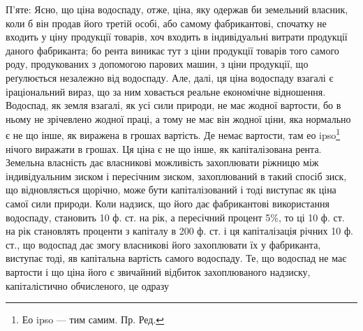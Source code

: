 П’яте: Ясно, що ціна водоспаду, отже, ціна, яку одержав би земельний
власник, коли б він продав його третій особі, або самому фабрикантові,
спочатку не входить у ціну продукції товарів, хоч входить в індивідуальні
витрати продукції даного фабриканта; бо рента виникає тут з ціни продукції
товарів того самого роду, продукованих з допомогою парових машин,
з ціни продукції, що реґулюється незалежно від водоспаду. Але, далі, ця ціна
водоспаду взагалі є іраціональний вираз, що за ним ховається реальне економічне
відношення. Водоспад, як земля взагалі, як усі сили природи, не має
жодної вартости, бо в ньому не зрічевлено жодної праці, а тому не має він
жодної ціни, яка нормально є не що інше, як виражена в грошах вартість.
Де немає вартости, там ео ipso\footnote*{
Ео ipso — тим самим. Пр. Ред.
} нічого виражати в грошах. Ця ціна є не
що інше, як капіталізована рента. Земельна власність дає власникові можливість
захоплювати ріжницю між індивідуальним зиском і пересічним зиском,
захоплюваний в такий спосіб зиск, що відновляється щорічно, може бути капіталізований
і тоді виступає як ціна самої сили природи. Коли надзиск, що
його дає фабрикантові використання водоспаду, становить 10 ф. ст. на рік, а
пересічний процент 5\%, то ці 10 ф. ст. на рік становлять проценти з капіталу в
200 ф. ст. і ця капіталізація річних 10 ф. ст., що водоспад дає змогу власникові
його захоплювати їх у фабриканта, виступає тоді, яв капітальна вартість самого
водоспаду. Те, що водоспад не має вартости і що ціна його є звичайний
відбиток захоплюваного надзиску, капіталістично обчисленого, це одразу